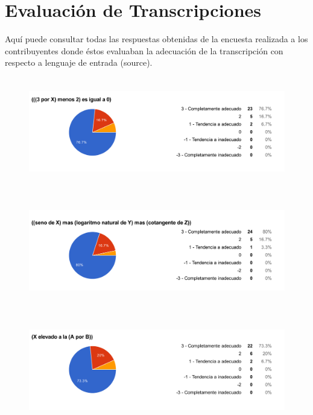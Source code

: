 
\chapter{Evaluación de Transcripciones} %

\label{AppendixA} %

Aquí puede consultar todas las respuestas obtenidas de la encuesta realizada a los contribuyentes donde éstos evaluaban la adecuación de la transcripción con respecto a lenguaje de entrada (source).

\begin{figure}[H]
\centering
	\includegraphics[width=15cm, height=4.74cm]{Figures/hjudgement/r1}
	\caption[]{}
\label{fig:parsed_corpus}
\end{figure}

\begin{figure}[H]
\centering
	\includegraphics[width=15cm, height=4.74cm]{Figures/hjudgement/r2}
	\caption[]{}
\label{fig:parsed_corpus}
\end{figure}

\begin{figure}[H]
\centering
	\includegraphics[width=15cm, height=4.74cm]{Figures/hjudgement/r3}
	\caption[]{}
\label{fig:parsed_corpus}
\end{figure}


